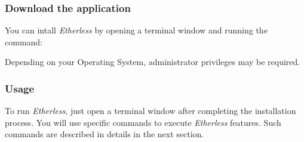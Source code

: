     \subsubsection{Download the application}
    You can intall \textit{Etherless} by opening a terminal window and running the command:
     \begin{center}
     \end{center}
     Depending on your Operating System, administrator privileges may be required. \\
         \subsubsection{Usage}
      To run \textit{Etherless}, just open a terminal window after completing the installation process. You will use specific commands to execute \textit{Etherless} features. Such commands are described in details in the next section.
